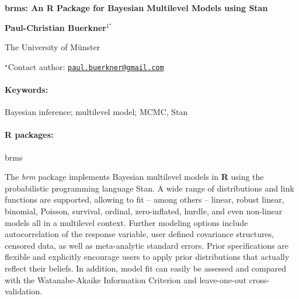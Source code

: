 \documentclass[11pt, a4paper]{article}
\renewcommand{\title}[1]{\begin{center}{\bf \LARGE #1}\end{center}}
\newcommand{\keywords}{\paragraph{Keywords:}}
\newcommand{\packages}{\paragraph{R packages:}}
\begin{document}
\pagestyle{empty}

\title{brms: An R Package for Bayesian Multilevel Models using Stan}

\begin{center}
  {\bf Paul-Christian Buerkner$^{1^\star}$}
\end{center}

\vskip 0.3cm

\begin{affiliations}
\begin{enumerate}
\begin{minipage}{0.915\textwidth}
\centering
\item The University of Münster \\[-2pt]
\end{minipage}
\end{enumerate}
$^\star$Contact author: \href{mailto:paul.buerkner@gmail.com}{\nolinkurl{paul.buerkner@gmail.com}}\\
\end{affiliations}

\vskip 0.5cm

\begin{minipage}{0.915\textwidth}
\keywords Bayesian inference; multilevel model; MCMC, Stan
\packages brms
\end{minipage}

\vskip 0.8cm

The \emph{brm} package implements Bayesian multilevel models in
\textbf{R} using the probabilistic programming language Stan. A wide
range of distributions and link functions are supported, allowing to fit
-- among others -- linear, robust linear, binomial, Poisson, survival,
ordinal, zero-inflated, hurdle, and even non-linear models all in a
multilevel context. Further modeling options include autocorrelation of
the response variable, user defined covariance structures, censored
data, as well as meta-analytic standard errors. Prior specifications are
flexible and explicitly encourage users to apply prior distributions
that actually reflect their beliefs. In addition, model fit can easily
be assessed and compared with the Watanabe-Akaike Information Criterion
and leave-one-out cross-validation.
\end{document}
